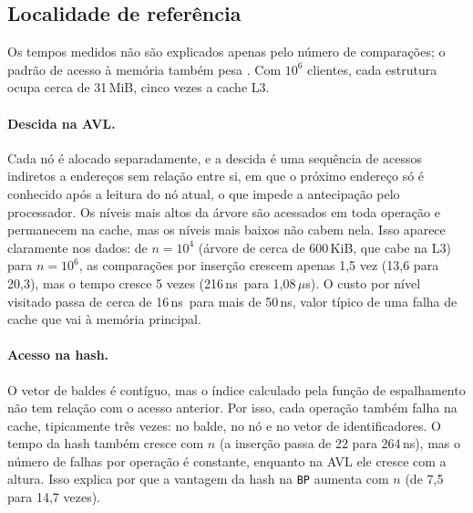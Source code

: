 \documentclass[letterpaper]{article} %
\newcommand{\ns}{\,ns}
\newcommand{\us}{\,$\mu$s}
\begin{document}
\subsection{Localidade de refer\^encia}

Os tempos medidos n\~ao s\~ao explicados apenas pelo n\'umero de compara\c{c}\~oes; o padr\~ao de acesso \`a mem\'oria tamb\'em pesa \citep{drepper2007}. Com $10^6$ clientes, cada estrutura ocupa cerca de 31\,MiB, cinco vezes a cache L3.

\paragraph{Descida na AVL.} Cada n\'o \'e alocado separadamente, e a descida \'e uma sequ\^encia de acessos indiretos a endere\c{c}os sem rela\c{c}\~ao entre si, em que o pr\'oximo endere\c{c}o s\'o \'e conhecido ap\'os a leitura do n\'o atual, o que impede a antecipa\c{c}\~ao pelo processador. Os n\'iveis mais altos da \'arvore s\~ao acessados em toda opera\c{c}\~ao e permanecem na cache, mas os n\'iveis mais baixos n\~ao cabem nela. Isso aparece claramente nos dados: de $n = 10^4$ (\'arvore de cerca de 600\,KiB, que cabe na L3) para $n = 10^6$, as compara\c{c}\~oes por inser\c{c}\~ao crescem apenas 1,5 vez (13,6 para 20,3), mas o tempo cresce 5 vezes (216\ns\ para 1,08\us). O custo por n\'ivel visitado passa de cerca de 16\ns\ para mais de 50\ns, valor t\'ipico de uma falha de cache que vai \`a mem\'oria principal.

\paragraph{Acesso na hash.} O vetor de baldes \'e cont\'iguo, mas o \'indice calculado pela fun\c{c}\~ao de espalhamento n\~ao tem rela\c{c}\~ao com o acesso anterior. Por isso, cada opera\c{c}\~ao tamb\'em falha na cache, tipicamente tr\^es vezes: no balde, no n\'o e no vetor de identificadores. O tempo da hash tamb\'em cresce com $n$ (a inser\c{c}\~ao passa de 22 para 264\ns), mas o n\'umero de falhas por opera\c{c}\~ao \'e constante, enquanto na AVL ele cresce com a altura. Isso explica por que a vantagem da hash na \texttt{BP} aumenta com $n$ (de 7,5 para 14,7 vezes).
\end{document}
